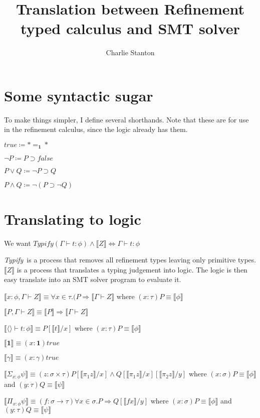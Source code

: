 \documentclass[12pt,a4paper,titlepage]{article}
\title{Translation between Refinement typed calculus and SMT solver}
\author{Charlie Stanton}
\newcommand{\typify}{\textit{Typify}}
\newcommand{\bbrackets}[1]{\llbracket #1 \rrbracket}
\begin{document}
    \maketitle

    \section{Some syntactic sugar}
    To make things simpler, I define several shorthands. Note that these are for use in the refinement calculus, since the logic already has them.

    $true \coloneqq \ast =_\textbf{1} \ast$

    $\neg P \coloneqq P \supset false$

    $P \lor Q \coloneqq \neg P \supset Q$

    $P \land Q \coloneqq \neg (P \supset \neg Q)$

    \section{Translating to logic}
    We want $\typify(\Gamma \vdash t: \phi) \land \bbrackets{Z} \Leftrightarrow \Gamma \vdash t: \phi$

    \typify\ is a process that removes all refinement types leaving only primitive types. $\llbracket Z \rrbracket$ is a process that translates a typing judgement into logic.
    The logic is then easy translate into an SMT solver program to evaluate it.

    $\bbrackets{x: \phi, \Gamma \vdash Z} \equiv \forall x \in \tau . (P \Rightarrow \bbrackets{\Gamma \vdash Z}$ where $(x: \tau)P \equiv \bbrackets{\phi}$

    $\bbrackets{P, \Gamma \vdash Z} \equiv \bbrackets{P} \Rightarrow \bbrackets{\Gamma \vdash Z}$

    $\bbrackets{\langle \rangle \vdash t: \phi} \equiv P[\bbrackets{t} / x]$ where $(x: \tau)P \equiv \bbrackets{\phi}$

    $\bbrackets{\textbf{1}} \equiv (x: \textbf{1}) true$

    $\bbrackets{\gamma} \equiv (x: \gamma) true$

    $\bbrackets{\Sigma_{x: \phi} \psi} \equiv (z: \sigma \times \tau) P[\bbrackets{\pi_1 z} / x] \land Q[\bbrackets{\pi_1 z} / x][\bbrackets{\pi_2 z} / y]$ where $(x: \sigma) P \equiv \bbrackets{\phi}$ and $(y: \tau) Q \equiv \bbrackets{\psi}$

    $\bbrackets{\Pi_{x: \phi} \psi} \equiv (f: \sigma \rightarrow \tau) \forall x \in \sigma . P \Rightarrow Q[\bbrackets{f x} / y]$ where $(x: \sigma)P \equiv \bbrackets{\phi}$ and $(y: \tau)Q \equiv \bbrackets{\psi}$
\end{document}
